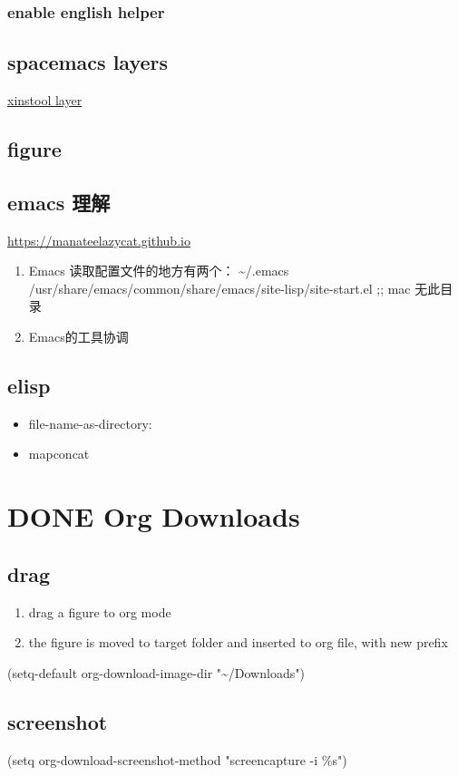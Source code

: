 \documentclass[11pt]{article}
\begin{document}
\subsubsection{enable english helper}
\label{sec:org456b4d4}
\subsection{spacemacs layers}
\label{sec:orgfc62d9c}
\href{file:///home/xin/.spacemacs.d/layer/xinstool/packages.el}{xinstool layer}
\subsection{figure}
\label{sec:orgbb7775d}
\subsection{emacs 理解}
\label{sec:org7b497c5}
\url{https://manateelazycat.github.io}
\begin{enumerate}
\item Emacs 读取配置文件的地方有两个：
\textasciitilde{}/.emacs
/usr/share/emacs/common/share/emacs/site-lisp/site-start.el ;; mac 无此目录
\item Emacs的工具协调
\end{enumerate}

\subsection{elisp}
\label{sec:org0b5ed85}
\begin{itemize}
\item file-name-as-directory:
\item mapconcat
\end{itemize}

\section{{\bfseries\sffamily DONE} Org Downloads}
\label{sec:org759bdd7}
\subsection{drag}
\label{sec:orgde6e5be}
\begin{enumerate}
\item drag a figure to org mode
\item the figure is moved to target folder and inserted to org file, with new prefix
\end{enumerate}
(setq-default org-download-image-dir "\textasciitilde{}/Downloads")
\subsection{screenshot}
\label{sec:org43e1945}
(setq org-download-screenshot-method "screencapture -i \%s")
\end{document}

